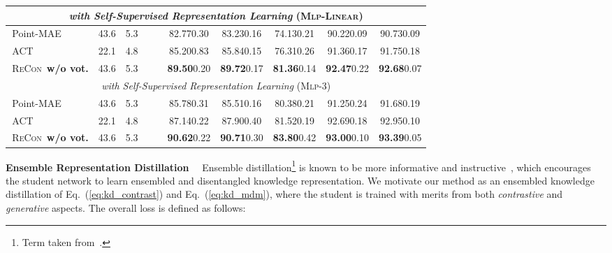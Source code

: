 \documentclass{article}
\theoremstyle{plain}
\theoremstyle{definition}
\theoremstyle{remark}
\def\recon{{\scshape ReCon}}
\newcommand{\reconcolor}[1]{\textcolor{reconcolor}{#1}}
\newcommand{\vitcolor}[1]{\textcolor{vitcolor}{#1}}
\newcommand{\br}{\reconcolor{\,}} \newcommand{\bv}{\vitcolor{\,}}  \newcommand{\bs}{\vitcolor{\,}} \newcommand{\bh}{\reconcolor{\,}}
\begin{document}
\begin{table*}[ht!]
\begin{center}
{\begin{tabular}{lccccccccc}
\midrule[0.6pt]
\multicolumn{10}{c}{\textit{with Self-Supervised Representation Learning} ({\scshape Mlp-Linear})}\\
\midrule[0.6pt]
\br Point-MAE~\citep{PointMAE} & 43.6 & 5.3 &  &  & 82.770.30 & 83.230.16 & 74.130.21 & 90.220.09 & 90.730.09 \\
\bv ACT~\citep{ACT23} & 22.1 & 4.8 &  &  & 85.200.83 & 85.840.15 & 76.310.26 & 91.360.17 & 91.750.18 \\
\rowcolor{linecolor}\br\recon~\textbf{w/o vot.} & 43.6 & 5.3 &  &  & \textbf{89.50}0.20 & \textbf{89.72}0.17 & \textbf{81.36}0.14 & \textbf{92.47}0.22 & \textbf{92.68}0.07\\
\midrule[0.6pt]
\multicolumn{10}{c}{\textit{with Self-Supervised Representation Learning} ({\scshape Mlp-3})}\\
\midrule[0.6pt]
\br Point-MAE~\citep{PointMAE} & 43.6 & 5.3 &  &  & 85.780.31 & 85.510.16 & 80.380.21 & 91.250.24 & 91.680.19 \\
\bv ACT~\citep{ACT23} & 22.1 & 4.8 &  &  & 87.140.22 & 87.900.40 & 81.520.19 & 92.690.18 & 92.950.10 \\
\rowcolor{linecolor}\br\recon~\textbf{w/o vot.} & 43.6 & 5.3 &  &  & \textbf{90.62}0.22 & \textbf{90.71}0.30 & \textbf{83.80}0.42& \textbf{93.00}0.10 & \textbf{93.39}0.05\\
\bottomrule[0.95pt]
\end{tabular}
}
\end{center}
\vspace{-16pt}
\end{table*}
 
\textbf{Ensemble Representation Distillation}~~
Ensemble distillation\footnote{Term taken from~\citet{CRD20}.} is known to be more informative and instructive~\citep{CRD20,Feed20,MultiExpertKD,KDOverview22}, which encourages the student network to learn ensembled and disentangled knowledge representation. We motivate our method as an ensembled knowledge distillation of Eq.~(\ref{eq:kd_contrast}) and Eq.~(\ref{eq:kd_mdm}), where the student is trained with merits from both \textit{contrastive} and \textit{generative} aspects. The overall loss  is defined as follows:
\end{document}
